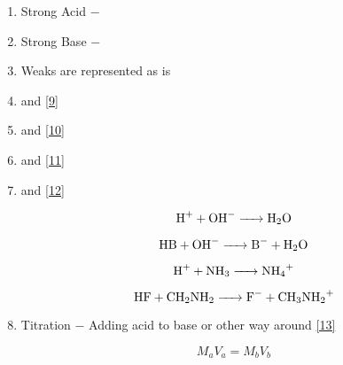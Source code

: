 \documentclass[12pt]{article}
\begin{document}
\begin{itemize}
\begin{enumerate}
    \item Strong Acid $-$  

    \item Strong Base $-$ 

    \item Weaks are represented as is

    \item {} and  \eqref{9}

    \item {} and  \eqref{10}

    \item {} and  \eqref{11}

    \item {} and  \eqref{12}

      \begin{equation}
        \ce{H+ + OH- -> H2O}
        \label{9}
      \end{equation}

      \begin{equation}
        \ce{HB + OH- -> B- + H2O}
        \label{10}
      \end{equation}

      \begin{equation}
        \ce{H+ + NH3 -> NH4+}
        \label{11}
      \end{equation}
      
      \begin{equation}
        \ce{HF + CH2NH2 -> F- + CH3NH2+}
        \label{12}
      \end{equation}

    \item Titration $-$ Adding acid to base or other way around \eqref{13}

      \begin{equation}
        M_aV_a=M_bV_b
        \label{13}
      \end{equation}

    \end{enumerate}

\end{itemize}
\end{document}
